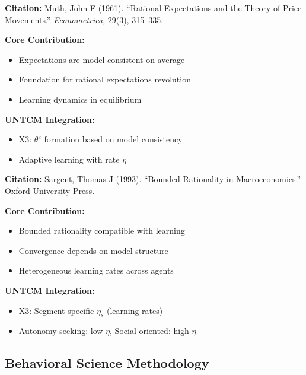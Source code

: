 \begin{tcolorbox}[colback=yellow!5!white,colframe=yellow!75!black,title=Key Paper: Muth (1961)]
\textbf{Citation:} Muth, John F (1961). ``Rational Expectations and the Theory of Price Movements.'' \textit{Econometrica}, 29(3), 315--335.

\textbf{Core Contribution:}
\begin{itemize}[nosep]
    \item Expectations are model-consistent on average
    \item Foundation for rational expectations revolution
    \item Learning dynamics in equilibrium
\end{itemize}

\textbf{UNTCM Integration:}
\begin{itemize}[nosep]
    \item X3: $\theta^e$ formation based on model consistency
    \item Adaptive learning with rate $\eta$
\end{itemize}
\end{tcolorbox}

\begin{tcolorbox}[colback=yellow!5!white,colframe=yellow!75!black,title=Key Paper: Sargent (1993)]
\textbf{Citation:} Sargent, Thomas J (1993). ``Bounded Rationality in Macroeconomics.'' Oxford University Press.

\textbf{Core Contribution:}
\begin{itemize}[nosep]
    \item Bounded rationality compatible with learning
    \item Convergence depends on model structure
    \item Heterogeneous learning rates across agents
\end{itemize}

\textbf{UNTCM Integration:}
\begin{itemize}[nosep]
    \item X3: Segment-specific $\eta_s$ (learning rates)
    \item Autonomy-seeking: low $\eta$, Social-oriented: high $\eta$
\end{itemize}
\end{tcolorbox}

\subsection{Behavioral Science Methodology}
\label{subsec:ot-methodology}

